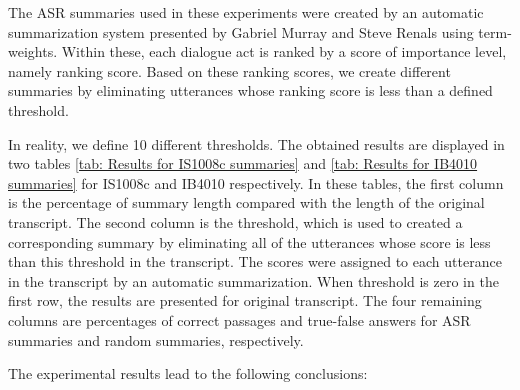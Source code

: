 The ASR summaries used in these experiments were created by an automatic summarization system presented by Gabriel Murray and Steve Renals \cite{ASR_summaries} using term-weights. Within these, each dialogue act is ranked by a score of importance level, namely ranking score. Based on these ranking scores, we create different summaries by eliminating utterances whose ranking score is less than a defined threshold.

In reality, we define 10 different thresholds. The obtained results are displayed in two tables \ref{tab: Results for IS1008c summaries} and \ref{tab: Results for IB4010 summaries} for IS1008c and IB4010 respectively. In these tables, the first column is the percentage of summary length compared with the length of the original transcript. The second column is the threshold, which is used to created a corresponding summary by eliminating all of the utterances whose score is less than this threshold in the transcript. The scores were assigned to each utterance in the transcript by an automatic summarization. When threshold is zero in the first row, the results are presented for original transcript. The four remaining columns are percentages of correct passages and true-false answers for ASR summaries and random summaries, respectively. 

The experimental results lead to the following conclusions:

